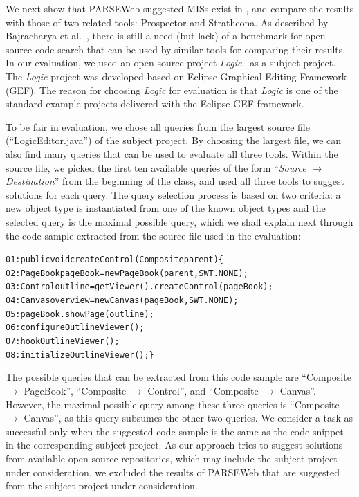 \documentclass{fp035-thummalapenta}
\begin{document}
We next show that PARSEWeb-suggested MISs exist in \realprojects{},
and compare the results with those of two related tools: Prospector
and Strathcona. As described by Bajracharya et
al.~\cite{sourcerer:baj}, there is still a need (but lack) of a
benchmark for open source code search that can be used by similar
tools for comparing their results. In our evaluation, we used an
open source project \emph{Logic}~\cite{Logic} as a subject project.
The \emph{Logic} project was developed based on Eclipse Graphical
Editing Framework (GEF). The reason for choosing \emph{Logic} for
evaluation is that \emph{Logic} is one of the standard example
projects delivered with the Eclipse GEF framework.

To be fair in evaluation, we chose all queries from the largest
source file (``LogicEditor.java'') of the subject project. 
By choosing the largest file, we can also find many
queries that can be used to evaluate all three tools. Within the
source file, we picked the first ten available queries of the form
``\emph{Source} $\rightarrow$ \emph{Destination}'' from the
beginning of the class, and used all three tools to suggest
solutions for each query. The query selection process is based on
two criteria: a new object type is instantiated from one of the
known object types and the selected query is the maximal possible
query, which we shall explain next through the code sample
extracted from the source file used in the evaluation:

\begin{CodeOut}
\begin{alltt}
01:public void createControl(Composite parent)\{
02:\hspace*{0.1in}PageBook pageBook = new PageBook(parent, SWT.NONE);
03:\hspace*{0.1in}Control outline = getViewer().createControl(pageBook);
04:\hspace*{0.1in}Canvas overview = new Canvas(pageBook, SWT.NONE);
05:\hspace*{0.1in}pageBook.showPage(outline);
06:\hspace*{0.1in}configureOutlineViewer();
07:\hspace*{0.1in}hookOutlineViewer();
08:\hspace*{0.1in}initializeOutlineViewer();\}
\end{alltt}
\end{CodeOut}

The possible queries that can be extracted from this code sample are
``Composite $\rightarrow$ PageBook'', ``Composite $\rightarrow$
Control'', and ``Composite $\rightarrow$ Canvas''. However, the
maximal possible query among these three queries is ``Composite
$\rightarrow$ Canvas'', as this query subsumes the other two
queries. We consider a task as successful only when the suggested
code sample is the same as the code snippet in the corresponding
subject project. As our approach tries to suggest solutions from
available open source repositories, which may include the subject
project under consideration, we excluded the results of PARSEWeb
that are suggested from the subject project under consideration.
\end{document}
